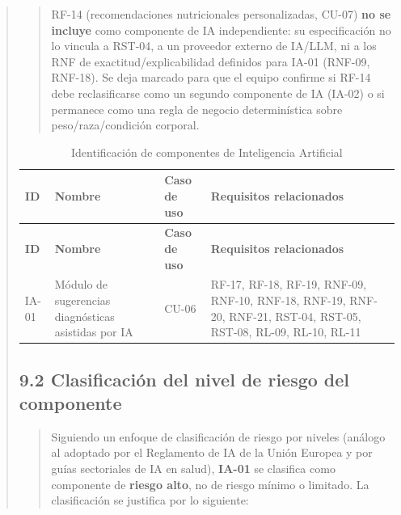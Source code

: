 \documentclass[
]{article}
\begin{document}
\begin{quote}
\begin{quote}
RF-14 (recomendaciones nutricionales personalizadas, CU-07)
\textbf{no se incluye} como componente de IA independiente: su especificación
no lo vincula a RST-04, a un proveedor externo de IA/LLM, ni a los RNF de
exactitud/explicabilidad definidos para IA-01 (RNF-09, RNF-18). Se deja
marcado para que el equipo confirme si RF-14 debe reclasificarse como un
segundo componente de IA (IA-02) o si permanece como una regla de negocio
determinística sobre peso/raza/condición corporal.
\end{quote}

\begin{longtable}{|
  >{\raggedright\arraybackslash}p{}|
  >{\raggedright\arraybackslash}p{}|
  >{\raggedright\arraybackslash}p{}|
  >{\raggedright\arraybackslash}p{}|}
\caption{Identificación de componentes de Inteligencia Artificial}
\label{tab:componentes-ia} \\
\hline
\textbf{ID} &
\textbf{Nombre} &
\textbf{Caso de uso} &
\textbf{Requisitos relacionados} \\
\hline
\endfirsthead

\hline
\textbf{ID} &
\textbf{Nombre} &
\textbf{Caso de uso} &
\textbf{Requisitos relacionados} \\
\hline
\endhead

IA-01 &
Módulo de sugerencias diagnósticas asistidas por IA &
CU-06 &
RF-17, RF-18, RF-19, RNF-09, RNF-10, RNF-18, RNF-19, RNF-20, RNF-21,
RST-04, RST-05, RST-08, RL-09, RL-10, RL-11 \\
\hline

\end{longtable}

\subsection{9.2 Clasificación del nivel de riesgo del componente}
\label{s9-2-clasificacion-riesgo}

\begin{quote}
Siguiendo un enfoque de clasificación de riesgo por niveles (análogo al
adoptado por el Reglamento de IA de la Unión Europea y por guías
sectoriales de IA en salud), \textbf{IA-01} se clasifica como componente
de \textbf{riesgo alto}, no de riesgo mínimo o limitado. La clasificación
se justifica por lo siguiente:


\end{quote}
\end{quote}
\end{document}
